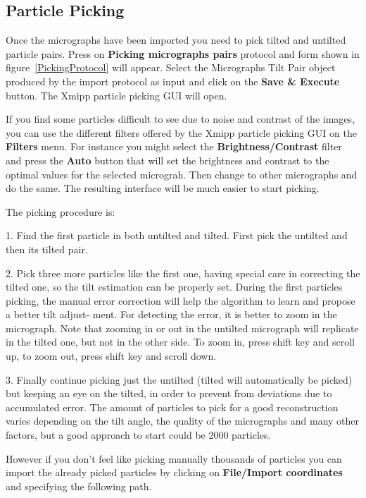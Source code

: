 \documentclass[12pt]{article} %
\begin{document}
\subsection{Particle Picking}
Once the micrographs have been imported you need to pick tilted and untilted particle pairs.
Press on \textbf{Picking micrographs pairs} protocol  and form shown in figure~\ref{PickingProtocol} 
will appear. Select the Micrographs Tilt Pair object produced by the import protocol as input and 
click on the \textbf{Save \& Execute} button. The Xmipp particle picking GUI will open.

If you find some particles difficult to see due to noise and contrast of the images, you can use the 
different filters offered by the Xmipp particle picking GUI on the \textbf{Filters} menu.
For instance you might select the \textbf{Brightness/Contrast} filter and press the \textbf{Auto} button that will 
set the brightness and contrast to the optimal values for the selected micrograh. Then change to other micrographs 
and do the same. The resulting interface will be much easier to start picking.

The picking procedure is:

1.  Find the first particle in both untilted and tilted. First pick the untilted and then its tilted
pair.

2.  Pick three more particles like the first one, having special care in correcting
the tilted one, so the tilt estimation can be properly set. During the first particles picking,
the manual error correction will help the algorithm to learn and propose a better tilt adjust-
ment. For detecting the error, it is better to zoom in the micrograph. Note that zooming in
or out in the untilted micrograph will replicate in the tilted one, but not in the other side.
To zoom in, press shift key and scroll up, to zoom out, press shift key and scroll down.

3.  Finally continue picking just the untilted (tilted will automatically be picked) but keeping
an eye on the tilted, in order to prevent from deviations due to accumulated error. The amount 
of particles to pick for a good reconstruction varies depending on the tilt angle,
the quality of the micrographs and many other factors, but a good approach to start could
be 2000 particles.

However if you don't feel like picking manually thousands of particles you can import the already picked 
particles by clicking on \textbf{File/Import coordinates} and specifying the following path.
\end{document}
